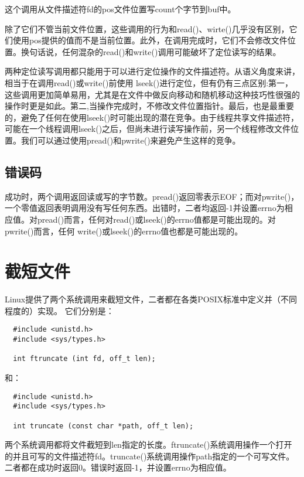 这个调用从文件描述符fd的pos文件位置写count个字节到buf中。

除了它们不管当前文件位置，这些调用的行为和read()、wirte()几乎没有区别，它们使用pos提供的值而不是当前位置。此外，在调用完成时，它们不会修改文件位置。换句话说，任何混杂的read()和write()调用可能破坏了定位读写的结果。

两种定位读写调用都只能用于可以进行定位操作的文件描述符。从语义角度来讲，相当于在调用read()或write()前使用 lseek()进行定位，但有仍有三点区别:第一，这些调用更加简单易用，尤其是在文件中做反向移动和随机移动这种技巧性很强的操作时更是如此。第二,当操作完成时，不修改文件位置指针。最后，也是最重要的，避免了任何在使用lseek()时可能出现的潜在竞争。由于线程共享文件描述符，可能在一个线程调用lseek()之后，但尚未进行读写操作前，另一个线程修改文件位置。我们可以通过使用pread()和pwrite()来避免产生这样的竞争。 

\subsection{错误码}

成功时，两个调用返回读或写的字节数。pread()返回零表示EOF；而对pwrite()，一个零值返回表明调用没有写任何东西。出错时，二者均返回-1并设置errno为相应值。对pread()而言，任何对read()或lseek()的errno值都是可能出现的。对pwrite()而言，任何 write()或lseek()的errno值也都是可能出现的。 

\section{截短文件}

Linux提供了两个系统调用来截短文件，二者都在各类POSIX标准中定义并（不同程度的）实现。 它们分别是：

\begin{lstlisting}
  #include <unistd.h>
  #include <sys/types.h>

  int ftruncate (int fd, off_t len);
\end{lstlisting}

和：

\begin{lstlisting}
  #include <unistd.h>
  #include <sys/types.h>

  int truncate (const char *path, off_t len);
\end{lstlisting}

两个系统调用都将文件截短到len指定的长度。ftruncate()系统调用操作一个打开的并且可写的文件描述符fd。truncate()系统调用操作path指定的一个可写文件。二者都在成功时返回0。错误时返回-1，并设置errno为相应值。

